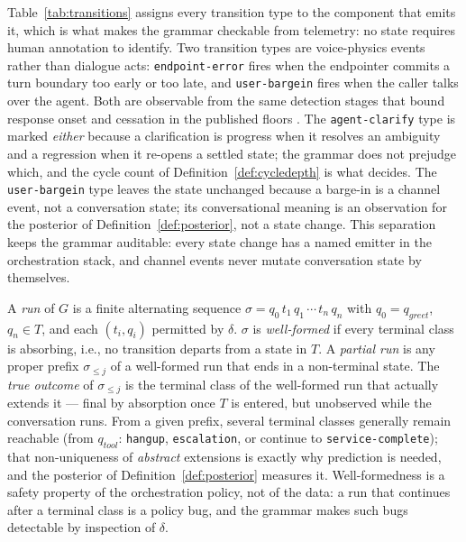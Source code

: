 Table~\ref{tab:transitions} assigns every transition type to the component that emits it, which
is what makes the grammar checkable from telemetry: no state requires human annotation to
identify.
Two transition types are voice-physics events rather than dialogue acts: \texttt{endpoint-error}
fires when the endpointer commits a turn boundary too early or too late, and \texttt{user-bargein}
fires when the caller talks over the agent.
Both are observable from the same detection stages that bound response onset and cessation in the
published floors \citep{garcia2026latencyfloor,garcia2026cessationfloor}.
The \texttt{agent-clarify} type is marked \emph{either} because a clarification is progress when
it resolves an ambiguity and a regression when it re-opens a settled state; the grammar does not
prejudge which, and the cycle count of Definition~\ref{def:cycledepth} is what decides.
The \texttt{user-bargein} type leaves the state unchanged because a barge-in is a channel event,
not a conversation state; its conversational meaning is an observation for the posterior of
Definition~\ref{def:posterior}, not a state change.
This separation keeps the grammar auditable: every state change has a named emitter in the
orchestration stack, and channel events never mutate conversation state by themselves.

\begin{definition}[Run]
\label{def:run}
A \emph{run} of $G$ is a finite alternating sequence
$\sigma = q_0\, t_1\, q_1\, \cdots\, t_n\, q_n$ with $q_0 = q_{greet}$, $q_n \in T$, and each
$(t_i, q_i)$ permitted by $\delta$.
$\sigma$ is \emph{well-formed} if every terminal class is absorbing, i.e., no transition departs
from a state in $T$.
A \emph{partial run} is any proper prefix $\sigma_{\leq j}$ of a well-formed run that ends in a
non-terminal state.
The \emph{true outcome} of $\sigma_{\leq j}$ is the terminal class of the well-formed run that
actually extends it --- final by absorption once $T$ is entered, but unobserved while the
conversation runs.
From a given prefix, several terminal classes generally remain reachable (from $q_{tool}$:
\texttt{hangup}, \texttt{escalation}, or continue to \texttt{service-complete}); that
non-uniqueness of \emph{abstract} extensions is exactly why prediction is needed, and the
posterior of Definition~\ref{def:posterior} measures it.
Well-formedness is a safety property of the orchestration policy, not of the data: a run that
continues after a terminal class is a policy bug, and the grammar makes such bugs detectable by
inspection of $\delta$.
\end{definition}

